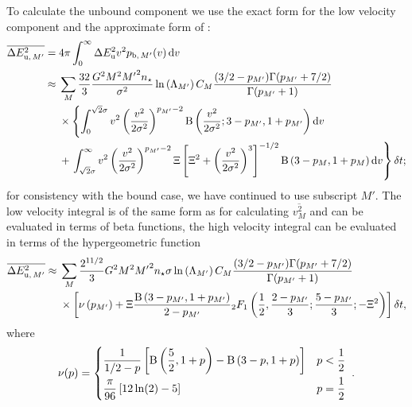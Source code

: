 To calculate the unbound component we use the exact form for the low velocity component and the approximate form of : 
\begin{align}
\overline{\Delta E^2_{\mathrm{u},\,M'}} = {} & 4\pi\int_{0}^{\infty}{\Delta E^2_\mathrm{u} v^2 p_{\mathrm{b},\,M'}(v)}\,\mathrm{d}{v} \\
 \approx {} & \sum_M\dfrac{32}{3}\dfrac{G^2M^2{M'}^2n_\star}{\sigma^2}\ln\left(\Lambda_{M'}\right) C_M \dfrac{(3/2 - p_{M'})\Gamma(p_{M'} + 7/2)}{\Gamma(p_{M'} + 1)} \nonumber \\*
 {} & \times \left\{ \int_{0}^{\sqrt{2}\sigma}{v^2\left(\dfrac{v^2}{2\sigma^2}\right)^{p_{M'}-2}\mathrm{B}\left(\dfrac{v^2}{2\sigma^2};3-p_{M'},1+p_{M'}\right)}\,\mathrm{d}{v} \right. \nonumber \\* 
 {} & + \left. \int_{\sqrt{2}\sigma}^{\infty}{v^2\left(\dfrac{v^2}{2\sigma^2}\right)^{p_{M'}-2} \Xi\left[\Xi^2 + \left(\dfrac{v^2}{2\sigma^2}\right)^3\right]^{-1/2} \mathrm{B}\left(3-p_M,1+p_M\right)}\,\mathrm{d}{v} \right\} \delta t;
\end{align}
for consistency with the bound case, we have continued to use subscript $M'$. The low velocity integral is of the same form as for calculating $\overline{v^2_M}$ and can be evaluated in terms of beta functions, the high velocity integral can be evaluated in terms of the hypergeometric function \citep[15.6.1]{Olver2010}
\begin{align}
\overline{\Delta E^2_{\mathrm{u},\,M'}} \approx {} & \sum_M\dfrac{2^{11/2}}{3}G^2M^2{M'}^2n_\star\sigma\ln\left(\Lambda_{M'}\right) C_M \dfrac{(3/2 - p_{M'})\Gamma(p_{M'} + 7/2)}{\Gamma(p_{M'} + 1)} \nonumber \\
 & \times \left[\nu\left(p_{M'}\right) + \Xi\dfrac{\mathrm{B}\left(3-p_{M'},1+p_{M'}\right)}{2-p_{M'}}{_2F_1}\left(\dfrac{1}{2},\dfrac{2-p_{M'}}{3};\dfrac{5-p_{M'}}{3};-\Xi^2\right) \right] \delta t,
 \label{eq:E2-u}
\end{align}
where
\begin{equation}
\nu(p) = \begin{cases} \recip{1/2 - p}\left[\Beta\left(\dfrac{5}{2},1+p\right) - \Beta\left(3-p,1+p\right)\right] \vspace{1mm} & p < \recip{2} \\
\dfrac{\pi}{96}\left[12 \ln(2) - 5\right] & p = \recip{2}
\end{cases} \; .
\end{equation}

